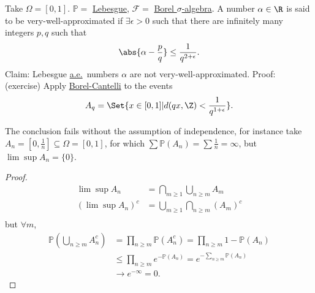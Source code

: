 \documentclass{article}
\newcommand{\1}[1]{\mathbbm{1}_{#1}}
\newcommand{\Prob}{\mathbb{P}}
\begin{document}
\begin{eg}
    Take $\Omega = [0, 1]$. $\Prob=$ \hyperlink{def:lebMeas}{Lebesgue}, $\mathcal{F}=$ \hyperlink{def:borelAlg}{Borel $\sigma$-algebra}.
    A number $\alpha \in \R$ is said to be very-well-approximated if $\exists \epsilon > 0$ such that there are infinitely many integers $p,q$ such that
    \begin{equation*}
        \abs{\alpha - \frac{p}{q}} \leq \frac{1}{q^{2 + \epsilon}}.
    \end{equation*}
    Claim: Lebesgue \hyperlink{def:ae}{a.e.}\ numbers $\alpha$ are not very-well-approximated.
    Proof: (exercise) Apply \hyperlink{lem:bc1}{Borel-Cantelli} to the events
    \begin{equation*}
        A_q = \Set{x \in [0, 1] | d(q x, \Z) < \frac{1}{q^{1 + \epsilon}}}.
    \end{equation*}
\end{eg}


\begin{remark}
    The conclusion fails without the assumption of independence, for instance take $A_n = [0, \frac{1}{n}] \subseteq \Omega = [0, 1]$, for which $\sum \Prob(A_n) = \sum \frac{1}{n} = \infty$, but $\lim \sup A_n = \{0\}$.
\end{remark}

\begin{proof}
    \begin{align*}
        \lim \sup A_n &= \bigcap_{m \geq 1} \bigcup_{n \geq m} A_m \\
        (\lim \sup A_n)^c &= \bigcup_{m \geq 1} \bigcap_{n \geq m} (A_m)^c \\
    \end{align*}
    but $\forall m$,
    \begin{align*}
        \Prob\left(\bigcup_{n \geq m} A_n^c\right)&= \prod_{n \geq m} \Prob(A_n^c) = \prod_{n \geq m} 1-\Prob(A_n) \\
                                                  &\leq \prod_{n \geq m} e^{-\Prob(A_n)} = e^{-\sum_{n \geq m} \Prob(A_n)} \\
                                                  &\to e^{-\infty} = 0.
    \end{align*}
\end{proof}
\end{document}
